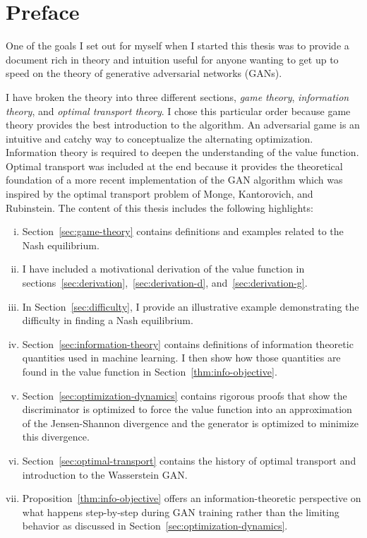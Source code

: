 \section{Preface}

One of the goals I set out for myself when I started this thesis was
to provide a document rich in theory and intuition useful for anyone
wanting to get up to speed on the theory of generative adversarial
networks (GANs).

I have broken the theory into three different sections, \textit{game
  theory}, \textit{information theory}, and \textit{optimal transport
  theory}.  I chose this particular order because game theory provides
the best introduction to the algorithm.  An adversarial game is an
intuitive and catchy way to conceptualize the alternating
optimization.  Information theory is required to deepen the
understanding of the value function.  Optimal transport was included
at the end because it provides the theoretical foundation of a more
recent implementation of the GAN algorithm which was inspired by the
optimal transport problem of Monge, Kantorovich, and Rubinstein.  The
content of this thesis includes the following highlights:
\begin{enumerate}[(i)]
\item Section~\ref{sec:game-theory} contains definitions and examples
  related to the Nash equilibrium.
\item I have included a motivational derivation of the value function
  in sections~\ref{sec:derivation},~\ref{sec:derivation-d},
  and~\ref{sec:derivation-g}.
\item In Section~\ref{sec:difficulty}, I provide an illustrative
  example demonstrating the difficulty in finding a Nash equilibrium.
\item Section~\ref{sec:information-theory} contains definitions of
  information theoretic quantities used in machine learning. I then
  show how those quantities are found in the value function in
  Section~\ref{thm:info-objective}.
\item Section~\ref{sec:optimization-dynamics} contains rigorous proofs
  that show the discriminator is optimized to force the value function
  into an approximation of the Jensen-Shannon divergence and the
  generator is optimized to minimize this divergence.
\item Section~\ref{sec:optimal-transport} contains the history of
  optimal transport and introduction to the Wasserstein GAN.
\item Proposition~\ref{thm:info-objective} offers an
  information-theoretic perspective on what happens step-by-step
  during GAN training rather than the limiting behavior as discussed
  in Section~\ref{sec:optimization-dynamics}.
\end{enumerate}
